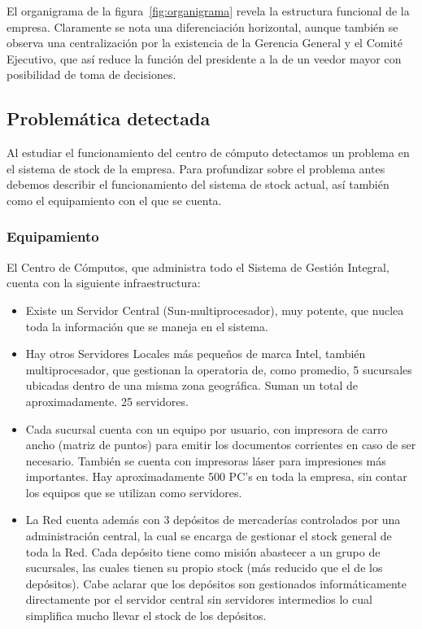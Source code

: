 El organigrama de la figura~\ref{fig:organigrama} revela la estructura
funcional de la empresa.  Claramente se nota una diferenciación horizontal,
aunque también se observa una centralización  por la existencia de la Gerencia
General y el Comité Ejecutivo, que así reduce la función del presidente a la de
un veedor mayor con posibilidad de toma de decisiones.


\subsection{Problemática detectada}

Al estudiar el funcionamiento del centro de cómputo detectamos un problema en
el sistema de stock de la empresa. Para profundizar sobre el problema antes
debemos describir el funcionamiento del sistema de stock actual, así también
como el equipamiento con el que se cuenta.


\subsubsection{Equipamiento}

El Centro de Cómputos, que administra todo el Sistema de Gestión Integral,
cuenta con la siguiente infraestructura:

\begin{itemize}

  \item Existe un Servidor Central (Sun-multiprocesador), muy potente, que
    nuclea toda la información que se maneja en el sistema.

  \item Hay otros Servidores Locales más pequeños de marca Intel, también
    multiprocesador, que gestionan la operatoria de, como promedio, 5 sucursales
    ubicadas dentro de una misma zona geográfica. Suman un total de aproximadamente. 25
    servidores.

  \item Cada sucursal cuenta con un equipo por usuario, con impresora de carro
    ancho (matriz de puntos) para emitir los documentos corrientes en caso de ser
    necesario. También se cuenta con impresoras láser para impresiones más
    importantes. Hay aproximadamente 500 PC’s en toda la empresa, sin contar los
    equipos que se utilizan como servidores.

  \item La Red cuenta además con 3 depósitos de mercaderías controlados por una
    administración central, la cual se encarga de gestionar el stock general de
    toda la Red. Cada depósito tiene como misión abastecer a un grupo de
    sucursales, las cuales tienen su propio stock (más reducido que el de los
    depósitos). Cabe aclarar que los depósitos son gestionados informáticamente
    directamente por el servidor central sin servidores intermedios lo cual
    simplifica mucho llevar el stock de los depósitos.

\end{itemize}


